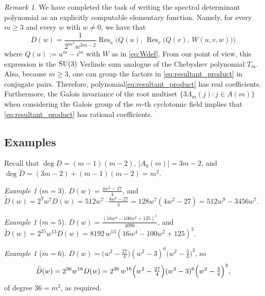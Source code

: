\documentclass[11pt,reqno]{amsart}
\theoremstyle{remark}
\newtheorem{remark}[theorem]{Remark}
\newtheorem{example}[theorem]{Example}
\DeclareMathOperator{\Res}{Res}
\begin{document}
\begin{remark}
\label{rem:D-as-resultant} We have completed the task of writing the spectral determinant polynomial as an explicitly computable elementary function.  Namely,
for every $m\ge3$ and every $w$ with $w\ne0$, we have that
\[
D(w) = \frac{1}{2^{m^2}w^{3m-2}}\Res_u\Big(Q(u),\,\Res_v\big(Q(v),\,W(u,v,w)\big)\Big)
\]
where $Q(u):=u^m-i^m$ with $W$ as in \eqref{eq:Wdef}.  From our point of view, this expression is
the $\textrm{\rm SU}(3)$ Verlinde sum analogue of the Chebyshev polynomial $T_{m}$. Also, because
$m \geq 3$, one can group the factors in \eqref{eq:resultant_product} in conjugate pairs. Therefore, polynomial\eqref{eq:resultant_product} has real coefficients.  Furthermore, the Galois invariance of
the root multiset $\{3\Lambda_{m}(j): j\in A(m)\}$ when considering the Galois group of the $m$-th cyclotomic field implies that \eqref{eq:resultant_product}
has rational coefficients.
\end{remark}

\subsection{Examples}

Recall that $\deg D=(m-1)(m-2)$, $|A_0(m)|=3m-2$, and
$\deg\widetilde D=(3m-2)+(m-1)(m-2)=m^2$.

\begin{example}[$m=3$]
$D(w)=\tfrac{4w^2-27}{4}$, and
$\widetilde D(w)=2^9w^7D(w)=512w^7\cdot\tfrac{4w^2-27}{4}=128w^7(4w^2-27)=512w^9-3456w^7$.
\end{example}


\begin{example}[$m=5$]
$D(w)=\tfrac{(16w^4-100w^2+125)^3}{4096}$, and
$\widetilde D(w)=2^{25}w^{13}D(w)=8192\,w^{13}(16w^4-100w^2+125)^3$.
\end{example}

\begin{example}[$m = 6$]
$D(w) = \bigl(w^2-\tfrac{27}{4}\bigr)(w^2-3)^6\bigl(w^2-\tfrac34\bigr)^3$, so
\[
\widetilde D(w) = 2^{36} w^{16} D(w)
= 2^{36}\, w^{16}\Bigl(w^2-\tfrac{27}{4}\Bigr)(w^2-3)^6\Bigl(w^2-\tfrac34\Bigr)^3,
\]
of degree $36 = m^2$, as required.
\end{example}
\end{document}
